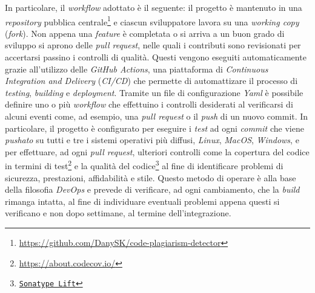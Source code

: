 In particolare, il \textit{workflow} adottato è il seguente: il progetto è mantenuto in una \textit{repository} pubblica centrale\footnote{\url{https://github.com/DanySK/code-plagiarism-detector}} e ciascun sviluppatore lavora su una \textit{working copy} (\textit{fork}).
%
Non appena una \textit{feature} è completata o si arriva a un buon grado di sviluppo si aprono delle \textit{pull request}, nelle quali i contributi sono revisionati per accertarsi passino i controlli di qualità.
%
Questi vengono eseguiti automaticamente grazie all'utilizzo delle \textit{GitHub Actions}, una piattaforma di \textit{Continuous Integration and Delivery} (\textit{CI/CD}) che permette di automattizare il processo di \textit{testing}, \textit{building} e \textit{deployment}.
%
Tramite un file di configurazione \textit{Yaml} è possibile definire uno o più \textit{workflow} che effettuino i controlli desiderati al verificarsi di alcuni eventi come, ad esempio, una \textit{pull request} o il \textit{push} di un nuovo commit.
%
In particolare, il progetto è configurato per eseguire i \textit{test} ad ogni \textit{commit} che viene \textit{pushato} su tutti e tre i sistemi operativi più diffusi, \textit{Linux}, \textit{MacOS}, \textit{Windows}, e per effettuare, ad ogni \textit{pull request}, ulteriori controlli come la copertura del codice in termini di test\footnote{\url{https://about.codecov.io/}} e la qualità del codice\footnote{\href{shorturl.at/enwzD}{\texttt{Sonatype Lift}}} al fine di identificare problemi di sicurezza, prestazioni, affidabilità e stile.
%
Questo metodo di operare è alla base della filosofia \textit{DevOps} e prevede di verificare, ad ogni cambiamento, che la \textit{build} rimanga intatta, al fine di individuare eventuali problemi appena questi si verificano e non dopo settimane, al termine dell'integrazione.

